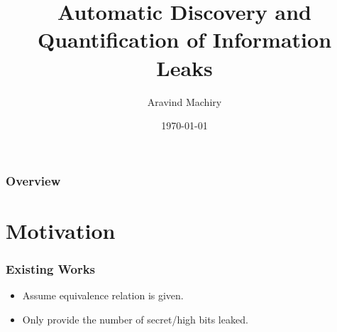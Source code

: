 \documentclass{beamer}
\title[Constraint Based Leak Detection]{Automatic Discovery and Quantification of Information Leaks} %
\author{Aravind Machiry} %
\institute[UC Santa Barbara] %
{
University of California \\ %
\medskip
\textit{machiry@cs.ucsb.edu} %
}
\date{\today} %
\begin{document}

\begin{frame}
\titlepage %
\end{frame}

\begin{frame}
\frametitle{Overview} %
\tableofcontents %
\end{frame}


\section{Motivation} %

\begin{frame}
\frametitle{Existing Works}
\begin{itemize}
\item Assume equivalence relation is given.
\item Only provide the number of secret/high bits leaked.
\end{itemize}
\end{frame}

\end{document}
